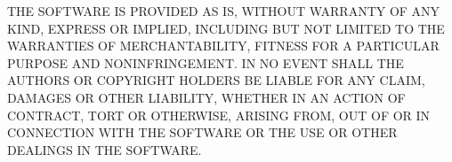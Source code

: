 T\+HE S\+O\+F\+T\+W\+A\+RE IS P\+R\+O\+V\+I\+D\+ED \textquotesingle{}AS IS\textquotesingle{}, W\+I\+T\+H\+O\+UT W\+A\+R\+R\+A\+N\+TY OF A\+NY K\+I\+ND, E\+X\+P\+R\+E\+SS OR I\+M\+P\+L\+I\+ED, I\+N\+C\+L\+U\+D\+I\+NG B\+UT N\+OT L\+I\+M\+I\+T\+ED TO T\+HE W\+A\+R\+R\+A\+N\+T\+I\+ES OF M\+E\+R\+C\+H\+A\+N\+T\+A\+B\+I\+L\+I\+TY, F\+I\+T\+N\+E\+SS F\+OR A P\+A\+R\+T\+I\+C\+U\+L\+AR P\+U\+R\+P\+O\+SE A\+ND N\+O\+N\+I\+N\+F\+R\+I\+N\+G\+E\+M\+E\+NT. IN NO E\+V\+E\+NT S\+H\+A\+LL T\+HE A\+U\+T\+H\+O\+RS OR C\+O\+P\+Y\+R\+I\+G\+HT H\+O\+L\+D\+E\+RS BE L\+I\+A\+B\+LE F\+OR A\+NY C\+L\+A\+IM, D\+A\+M\+A\+G\+ES OR O\+T\+H\+ER L\+I\+A\+B\+I\+L\+I\+TY, W\+H\+E\+T\+H\+ER IN AN A\+C\+T\+I\+ON OF C\+O\+N\+T\+R\+A\+CT, T\+O\+RT OR O\+T\+H\+E\+R\+W\+I\+SE, A\+R\+I\+S\+I\+NG F\+R\+OM, O\+UT OF OR IN C\+O\+N\+N\+E\+C\+T\+I\+ON W\+I\+TH T\+HE S\+O\+F\+T\+W\+A\+RE OR T\+HE U\+SE OR O\+T\+H\+ER D\+E\+A\+L\+I\+N\+GS IN T\+HE S\+O\+F\+T\+W\+A\+RE. 